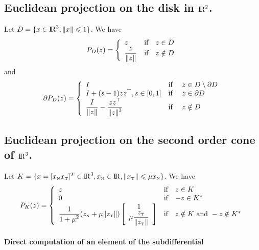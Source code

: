 \subsection{Euclidean projection on the disk  in $\mathrm{I\!R}^2$.}
Let $D=\{x \in \mathrm{I\!R}^3, \|x\| \leqslant 1\}$. We have 
\begin{equation}
  \label{eq:projD}
  P_{D}(z) =\left\{
  \begin{array}{lcl}
    z &\text{if}& z \in D \\
    \Frac {z} {\|z\|}& \text{if}&z \notin D
    \end{array}\right. 
  \end{equation}
 and
\begin{equation}
  \label{eq:sub-projD}
  \partial P_{D}(z) =\left\{
  \begin{array}{lcl}
   I &\text{if }& z \in D \setminus \partial D \\
   I + (s-1)z z^\top , s\in [0,1]   &\text{if }& z \in  \partial D \\
   \Frac I {\|z\|} - \Frac{z z^\top}{\|z\|^3} &\text{if }& z \notin D  
   \end{array}\right. 
\end{equation}


\subsection{Euclidean projection on the second order cone of $\mathrm{I\!R}^3$.}
Let $K=\{x = [x_{\hbox{\tiny{N}}} x_{\hbox{\tiny{T}}}]^T \in \mathrm{I\!R}^3, x_{\hbox{\tiny{N}}} \in \mathrm{I\!R}, \|x_{{\hbox{\tiny{T}}}}\| \leqslant \mu x_{{\hbox{\tiny{N}}}}\}$. We have 
\begin{equation}
  \label{eq:proj}
  P_{K}(z) =\left\{
  \begin{array}{lcl}
    z &\text{if}& z \in K \\
    0 &\text{if}& -z \in K^* \\
    \Frac 1 {1+\mu^2}(z_\n + \mu \|z_\t\| )
    \left[\begin{array}{c}
      1 \\
      \mu \Frac {z_\t} {\|z_\t\|}
      \end{array}\right]&\text{if}& z \notin K \text{ and } -z \notin K^*
    \end{array}\right. 
  \end{equation}

\paragraph{Direct computation of an element of the subdifferential}

